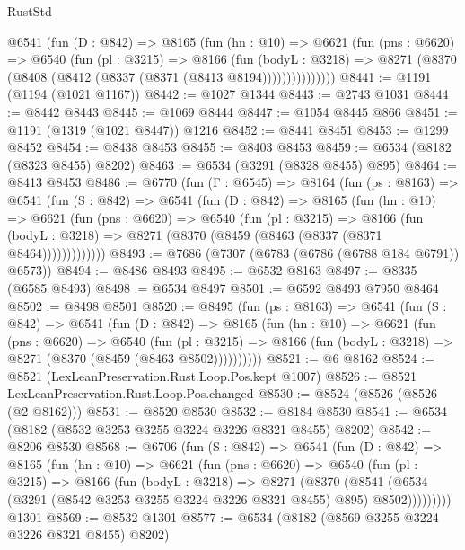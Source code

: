 \begin{lexlean}{RustStd}
\begin{coremodule}
          @6541
            (fun (D : @842) =>
            @8165
              (fun (hn : @10) =>
              @6621
                (fun (pns : @6620) =>
                @6540
                  (fun (pl : @3215) =>
                  @8166
                    (fun (bodyL : @3218) =>
                    @8271 (@8370 (@8408 (@8412 (@8337 (@8371 (@8413 @8194)))))))))))))))
@8441 := @1191 (@1194 (@1021 @1167))
@8442 := @1027 @1344
@8443 := @2743 @1031
@8444 := @8442 @8443
@8445 := @1069 @8444
@8447 := @1054 @8445 @866
@8451 := @1191 (@1319 (@1021 @8447)) @1216
@8452 := @8441 @8451
@8453 := @1299 @8452
@8454 := @8438 @8453
@8455 := @8403 @8453
@8459 := @6534 (@8182 (@8323 @8455) @8202)
@8463 := @6534 (@3291 (@8328 @8455) @895)
@8464 := @8413 @8453
@8486 := @6770
    (fun (Γ : @6545) =>
    @8164
      (fun (ps : @8163) =>
      @6541
        (fun (S : @842) =>
        @6541
          (fun (D : @842) =>
          @8165
            (fun (hn : @10) =>
            @6621
              (fun (pns : @6620) =>
              @6540
                (fun (pl : @3215) =>
                @8166
                  (fun (bodyL : @3218) =>
                  @8271 (@8370 (@8459 (@8463 (@8337 (@8371 @8464)))))))))))))
@8493 := @7686 (@7307 (@6783 (@6786 (@6788 @184 @6791)) @6573))
@8494 := @8486 @8493
@8495 := @6532 @8163
@8497 := @8335 (@6585 @8493)
@8498 := @6534 @8497
@8501 := @6592 @8493 @7950 @8464
@8502 := @8498 @8501
@8520 := @8495
    (fun (ps : @8163) =>
    @6541
      (fun (S : @842) =>
      @6541
        (fun (D : @842) =>
        @8165
          (fun (hn : @10) =>
          @6621
            (fun (pns : @6620) =>
            @6540
              (fun (pl : @3215) =>
              @8166 (fun (bodyL : @3218) => @8271 (@8370 (@8459 (@8463 @8502))))))))))
@8521 := @6 @8162
@8524 := @8521 (LexLeanPreservation.Rust.Loop.Pos.kept @1007)
@8526 := @8521 LexLeanPreservation.Rust.Loop.Pos.changed
@8530 := @8524 (@8526 (@8526 (@2 @8162)))
@8531 := @8520 @8530
@8532 := @8184 @8530
@8541 := @6534 (@8182 (@8532 @3253 @3255 @3224 @3226 @8321 @8455) @8202)
@8542 := @8206 @8530
@8568 := @6706
    (fun (S : @842) =>
    @6541
      (fun (D : @842) =>
      @8165
        (fun (hn : @10) =>
        @6621
          (fun (pns : @6620) =>
          @6540
            (fun (pl : @3215) =>
            @8166
              (fun (bodyL : @3218) =>
              @8271
                (@8370
                  (@8541
                    (@6534 (@3291 (@8542 @3253 @3255 @3224 @3226 @8321 @8455) @895) @8502)))))))))
    @1301
@8569 := @8532 @1301
@8577 := @6534 (@8182 (@8569 @3255 @3224 @3226 @8321 @8455) @8202)

\end{coremodule}
\end{lexlean}

